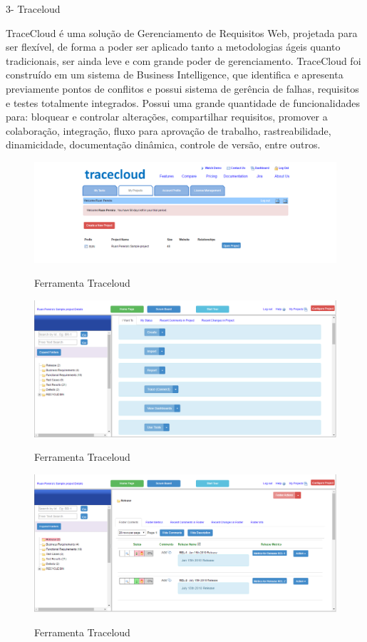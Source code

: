 3- Traceloud

TraceCloud é uma solução de Gerenciamento de Requisitos Web, projetada para ser flexível, de forma a poder ser aplicado tanto a metodologias ágeis quanto tradicionais, ser ainda leve e com grande poder de gerenciamento. TraceCloud foi construído em um sistema de Business Intelligence, que identifica e apresenta previamente pontos de conflitos e possui sistema de gerência de falhas, requisitos e testes totalmente integrados. Possui uma grande quantidade de funcionalidades para: bloquear e controlar alterações, compartilhar requisitos, promover a colaboração, integração, fluxo para aprovação de trabalho, rastreabilidade, dinamicidade, documentação dinâmica, controle de versão,  entre outros.

\FloatBarrier
\begin{figure}[!htpd]
		\centering
		\includegraphics[scale=0.5]{figuras/trace_1}
		\label{img:SAF}
		\caption{Ferramenta Traceloud }
\end{figure}
\FloatBarrier

\FloatBarrier
\begin{figure}[!htpd]
		\centering
		\includegraphics[scale=0.4]{figuras/trace_2}
		\label{img:SAF}
		\caption{Ferramenta Traceloud }
\end{figure}
\FloatBarrier

\FloatBarrier
\begin{figure}[!htpd]
		\centering
		\includegraphics[scale=0.5]{figuras/trace_3}
		\label{img:SAF}
		\caption{Ferramenta Traceloud }
\end{figure}
\FloatBarrier



